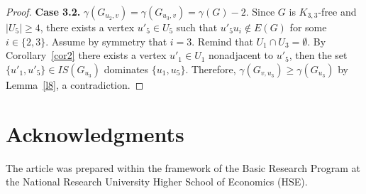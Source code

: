 \documentclass[12pt]{article}
\begin{document}
\begin{proof}
\textbf{Case 3.2.} $\gamma(G_{u_2,v}) = \gamma(G_{u_3,v}) = \gamma(G) - 2$. Since $G$ is $K_{3,3}$-free and $|U_5| \geq 4$, there exists a vertex $u'_5 \in U_5$ such that $u'_5u_i \notin E(G)$ for some $i \in \{2,3\}$. Assume by symmetry that $i = 3$. Remind that $U_1 \cap U_3 = \emptyset$. By Corollary~\ref{cor2} there exists a vertex $u'_1 \in U_1$ nonadjacent to $u'_5$, then the set $\{u'_1,u'_5\} \in IS(G_{u_3})$ dominates $\{u_1,u_5\}$. Therefore, $\gamma(G_{v,u_3}) \geq \gamma(G_{u_3})$ by Lemma~\ref{l8}, a contradiction.

\end{proof}

\section*{Acknowledgments}

The article was prepared within the framework of the Basic Research Program at the National Research University Higher School of Economics (HSE).
\end{document}
